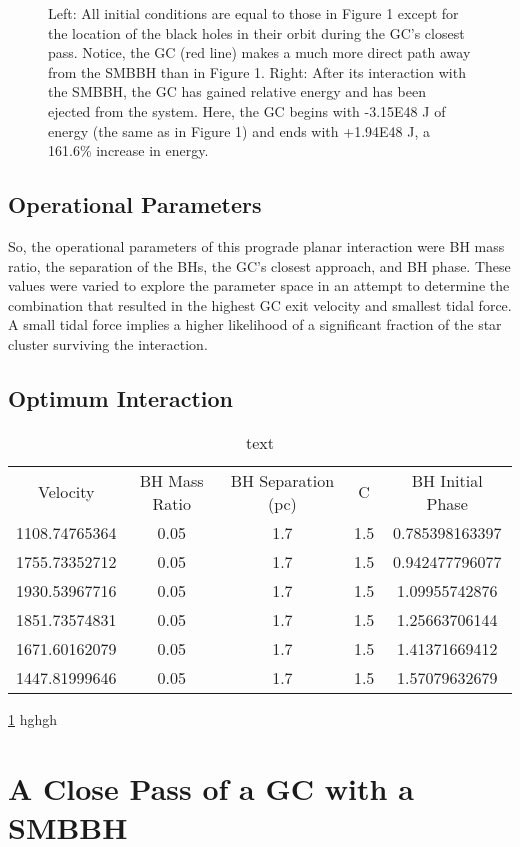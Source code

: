 \documentclass{aastex62}
\begin{document}
\begin{figure}

\caption{Left: All initial conditions are equal to those in Figure 1 except for the location of the black holes in their orbit during the GC's closest pass. Notice, the GC (red line) makes a much more direct path away from the SMBBH than in Figure 1. Right: After its interaction with the SMBBH, the GC has gained relative energy and has been ejected from the system. Here, the GC begins with -3.15E48 J of energy (the same as in Figure 1) and ends with +1.94E48 J, a 161.6\% increase in energy.}
\end{figure}
\subsection{Operational Parameters}
So, the operational parameters of this prograde planar interaction were BH mass ratio, the separation of the BHs, the GC's closest approach, and BH phase. These values were varied to explore the parameter space in an attempt to determine the combination that resulted in the highest GC exit velocity and smallest tidal force. A small tidal force implies a higher likelihood of a significant fraction of the star cluster surviving the interaction. 
\subsection{Optimum Interaction}
\begin{table}
\centering
\caption{text\label{key}}

\begin{tabular}{ccccc}
\hline \hline
Velocity & BH Mass Ratio & BH Separation (pc) & C & BH Initial Phase \\
1108.74765364 & 0.05 & 1.7 & 1.5 & 0.785398163397 \\
1755.73352712 & 0.05 & 1.7 & 1.5 & 0.942477796077 \\
1930.53967716 & 0.05 & 1.7 & 1.5 & 1.09955742876 \\
1851.73574831 & 0.05 & 1.7 & 1.5 & 1.25663706144 \\
1671.60162079 & 0.05 & 1.7 & 1.5 & 1.41371669412 \\
1447.81999646 & 0.05 & 1.7 & 1.5 & 1.57079632679
\end{tabular}
\end{table}
\ref{key} hghgh

\section{A Close Pass of a GC with a SMBBH}

\begin{thebibliography}{}

\end{thebibliography}
\end{document}
